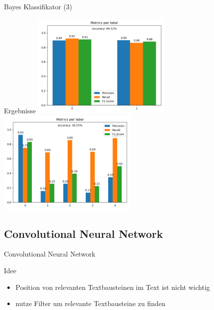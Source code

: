 \documentclass[aspectratio=169]{beamer} %
\begin{document}
\begin{frame}{Bayes Klassifikator (3)}
    \begin{block}{Ergebnisse}
        \includegraphics[width=6.8cm]{figures/evaluation_nbb.png} \includegraphics[width=6.8cm]{figures/evaluation_nbm.png}
    \end{block}
\end{frame}

\subsection{Convolutional Neural Network}

\begin{frame}{Convolutional Neural Network}
    \begin{block}{Idee}
    \begin{itemize}
        \item Position von relevanten Textbausteinen im Text ist nicht wichtig

        \item nutze Filter um relevante Textbausteine zu finden
        \begin{figure}
            \centering
            
        \end{figure}
    \end{itemize}
    \end{block}
\end{frame}
\end{document}
